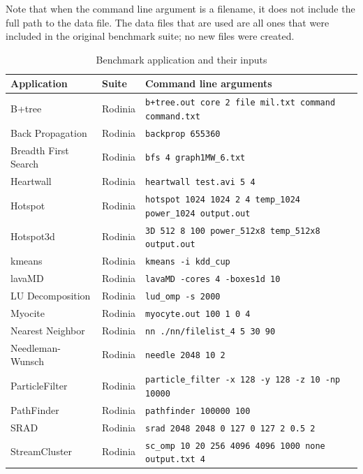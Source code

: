 \documentclass[12pt,twoside]{reedthesis}
\begin{document}
		Note that when the command line argument is a filename, it does not include the full path to the data file. The data files that are used are all ones that were included in the original benchmark suite; no new files were created. 
		
		
		\begin{table}
			\caption{Benchmark application and their inputs}
			\label{all-applications-table}
			\small
			\begin{tabular}{ |l|l|l| }
				\hline
				Application          & Suite   & Command line arguments  \\ \hline
				\hline
				B+tree & Rodinia  &  \texttt{b+tree.out core 2 file mil.txt command command.txt}  \\ \hline
				Back Propagation & Rodinia  &  \texttt{backprop 655360} \\ \hline
				Breadth First Search & Rodinia  &  \texttt{bfs 4 graph1MW\_6.txt}  \\ \hline
				Heartwall & Rodinia  & \texttt{heartwall test.avi 5 4} \\ \hline
				Hotspot & Rodinia  &   \texttt{hotspot 1024 1024 2 4 temp\_1024 power\_1024 output.out} \\ \hline
				Hotspot3d & Rodinia  & \texttt{3D 512 8 100 power\_512x8 temp\_512x8 output.out}   \\ \hline
				kmeans & Rodinia  &    \texttt{kmeans -i kdd\_cup} \\ \hline
				lavaMD & Rodinia  &  \texttt{lavaMD -cores 4 -boxes1d 10}   \\ \hline
				LU Decomposition & Rodinia    &  \texttt{lud\_omp -s 2000} \\ \hline
				Myocite & Rodinia  &  \texttt{myocyte.out 100 1 0 4}  \\ \hline
				Nearest Neighbor & Rodinia  &  \texttt{nn ./nn/filelist\_4 5 30 90}   \\ \hline
				Needleman-Wunsch & Rodinia  & \texttt{needle 2048 10 2}    \\ \hline
				ParticleFilter & Rodinia  &    \texttt{particle\_filter -x 128 -y 128 -z 10 -np 10000} \\ \hline
				PathFinder & Rodinia  &  \texttt{pathfinder 100000 100}   \\ \hline
				SRAD & Rodinia  &  \texttt{srad 2048 2048 0 127 0 127 2 0.5 2}   \\ \hline
				StreamCluster & Rodinia  &    \texttt{sc\_omp 10 20 256 4096 4096 1000 none output.txt 4} \\ \hline

\end{tabular}
\end{table}
\end{document}
